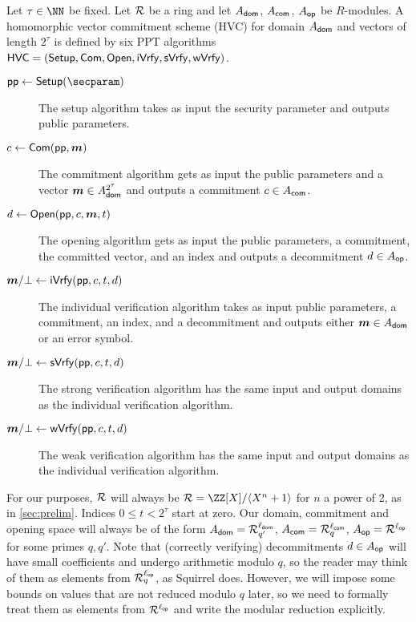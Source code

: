 \begin{definition}\label{def:hvc}
Let $\tau\in\NN$ be fixed.
  Let $\mathcal{R}$ be a ring and let $A_{\mathsf{dom}}$, $A_{\mathsf{com}}$, $A_{\mathsf{op}}$ be $R$-modules. %
  A homomorphic vector commitment scheme (HVC) for domain $A_{\mathsf{dom}}$ and vectors of length $2^\tau$ is defined by six PPT algorithms $\mathsf{HVC}=(\mathsf{Setup},\mathsf{Com},\allowbreak\mathsf{Open},\mathsf{iVrfy},\mathsf{sVrfy}, \mathsf{wVrfy})$.
\begin{description}
    \item[$\params\gets\setup(\secparam)$] The setup algorithm takes as input the security parameter and outputs public parameters.
    \item[$c \gets \mathsf{Com}(\mathsf{pp},\boldsymbol{m})$] The commitment algorithm gets as input the public parameters and a vector $\boldsymbol{m}\in A_{\mathsf{dom}}^{2^\tau}$ and outputs a commitment $c\in A_{\mathsf{com}}$.
    \item[$d \gets \mathsf{Open}(\mathsf{pp},c,\boldsymbol{m},t)$] The opening algorithm gets as input the public parameters, a commitment, the committed vector, and an index and outputs a decommitment $d\in A_{\mathsf{op}}$.
    \item[$\boldsymbol{m}/\bot\gets \mathsf{iVrfy}(\mathsf{pp},c,t,d)$] The individual verification algorithm takes as input public parameters, a commitment, an index, and a decommitment and outputs either $\boldsymbol{m}\in A_{\mathsf{dom}}$ or an error symbol.
    \item[$\boldsymbol{m}/\bot\gets \mathsf{sVrfy}(\mathsf{pp},c,t,d)$] The strong verification algorithm has the same input and output domains as the individual verification algorithm.
    \item[$\boldsymbol{m}/\bot\gets \mathsf{wVrfy}(\mathsf{pp},c,t,d)$] The weak verification algorithm has the same input and output domains as the individual verification algorithm.
  \end{description}
\end{definition}
For our purposes, $\mathcal{R}$ will always be $\ring = \defring$ for $n$ a power of 2, as in \autoref{sec:prelim}.
Indices $0\leq t < 2^\tau$ start at zero.
Our domain, commitment and opening space will always be of the form $A_{\mathsf{dom}} = \mathcal{R}_{q'}^{\ell_{\mathsf{dom}}}$, $A_{\mathsf{com}} = \mathcal{R}_q^{\ell_{\mathsf{com}}}$, $A_{\mathsf{op}} = \mathcal{R}^{\ell_{\mathsf{op}}}$ for some primes $q,q'$.
Note that (correctly verifying) decommitments $d\in A_{\mathsf{op}}$ will have small coefficients and undergo arithmetic modulo $q$, so the reader may think of them as elements from $\mathcal{R}_q^{\ell_{\mathsf{op}}}$, as Squirrel \cite{CCS:FleSimZha22} does.
However, we will impose some bounds on values that are not reduced modulo $q$ later, so we need to formally treat them as elements from $\mathcal{R}^{\ell_{\mathsf{op}}}$ and write the modular reduction explicitly.

